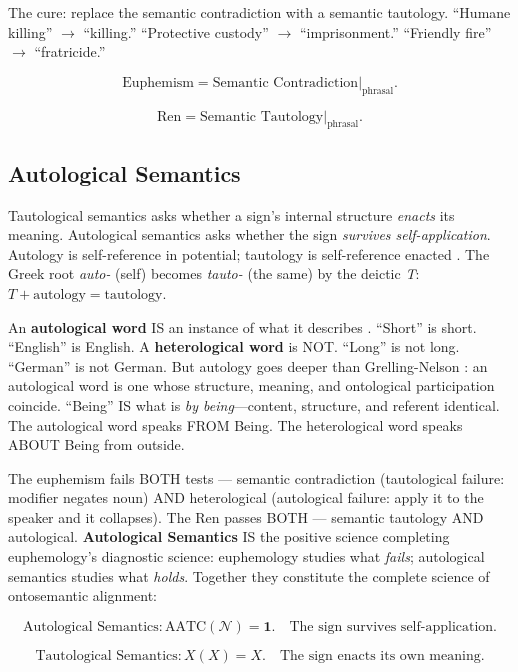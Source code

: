\documentclass[11pt, oneside]{article}
\theoremstyle{definition}
\begin{document}
The cure: replace the semantic contradiction with a semantic tautology. ``Humane killing'' $\to$ ``killing.'' ``Protective custody'' $\to$ ``imprisonment.'' ``Friendly fire'' $\to$ ``fratricide.''

$$\boxed{\text{Euphemism} = \text{Semantic Contradiction}|_{\text{phrasal}}.}$$

$$\boxed{\text{Ren} = \text{Semantic Tautology}|_{\text{phrasal}}.}$$

\subsection{Autological Semantics}\label{sec:autological}

Tautological semantics asks whether a sign's internal structure \textit{enacts} its meaning. Autological semantics asks whether the sign \textit{survives self-application}. Autology is self-reference in potential; tautology is self-reference enacted \cite{codex1}. The Greek root \textit{auto-} (self) becomes \textit{tauto-} (the same) by the deictic \textit{T}: $T + \text{autology} = \text{tautology}$.

An \textbf{autological word} IS an instance of what it describes \cite{lexentis}. ``Short'' is short. ``English'' is English. A \textbf{heterological word} is NOT. ``Long'' is not long. ``German'' is not German. But autology goes deeper than Grelling-Nelson \cite{lexentis}: an autological word is one whose structure, meaning, and ontological participation coincide. ``Being'' IS what is \textit{by being}---content, structure, and referent identical. The autological word speaks FROM Being. The heterological word speaks ABOUT Being from outside.

The euphemism fails BOTH tests --- semantic contradiction (tautological failure: modifier negates noun) AND heterological (autological failure: apply it to the speaker and it collapses). The Ren passes BOTH --- semantic tautology AND autological. \textbf{Autological Semantics} IS the positive science completing euphemology's diagnostic science: euphemology studies what \textit{fails}; autological semantics studies what \textit{holds}. Together they constitute the complete science of ontosemantic alignment:

$$\boxed{\text{Autological Semantics}: \text{AATC}(\mathcal{N}) = \mathbf{1}. \quad \text{The sign survives self-application.}}$$

$$\boxed{\text{Tautological Semantics}: X(X) = X. \quad \text{The sign enacts its own meaning.}}$$
\end{document}
